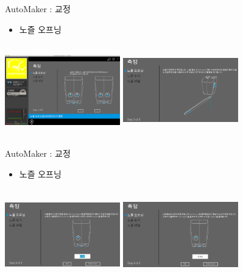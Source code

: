 \documentclass[11pt]{beamer}
\begin{document}
\begin{frame}[t]{AutoMaker : 교정 }\footnotesize
\begin{itemize}
\item 노즐 오프닝
\end{itemize}
\includegraphics[width=5cm, height=4cm]{./image/17_35.png} \@ \includegraphics[width=5cm, height=4cm]{./image/17_37.png}
\end{frame}

\begin{frame}[t]{AutoMaker : 교정 }\footnotesize
\begin{itemize}
\item 노즐 오프닝
\end{itemize}
\includegraphics[width=5cm, height=4cm]{./image/17_38.png} \@ \includegraphics[width=5cm, height=4cm]{./image/17_39.png}
\end{frame}
\end{document}
